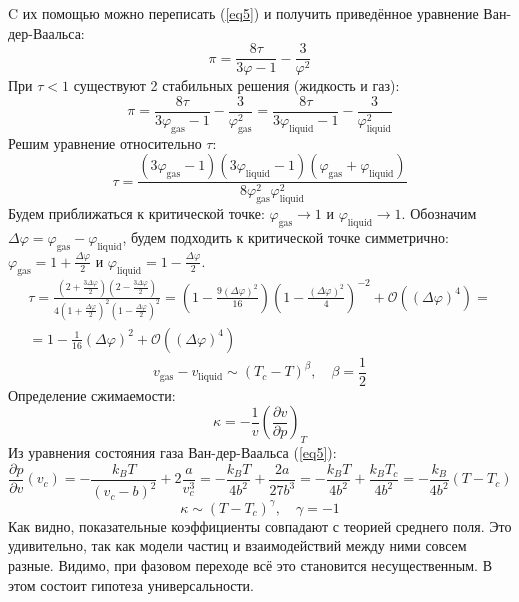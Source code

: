 \documentclass[12pt]{article}
\begin{document}
\begin{enumerate}
    C их помощью можно переписать (\ref{eq5}) и получить приведённое уравнение Ван-дер-Ваальса:
    \begin{equation}
        \pi=\frac{8\tau}{3\varphi-1}-\frac{3}{\varphi^2}
    \end{equation}
    При $\tau<1$ существуют 2 стабильных решения (жидкость и газ):
    \begin{equation}
        \pi=\frac{8\tau}{3\varphi_\text{gas}-1}-\frac{3}{\varphi^2_\text{gas}}=\frac{8\tau}{3\varphi_\text{liquid}-1}-\frac{3}{\varphi^2_\text{liquid}}
    \end{equation}
    Решим уравнение относительно $\tau$:
    \begin{equation}
        \tau=\frac{(3\varphi_\text{gas}-1)(3\varphi_\text{liquid}-1)(\varphi_\text{gas}+\varphi_\text{liquid})}{8\varphi^2_\text{gas}\varphi^2_\text{liquid}}
    \end{equation}
    Будем приближаться к критической точке: $\varphi_\text{gas}\rightarrow 1$ и $\varphi_\text{liquid}\rightarrow 1$. Обозначим $\Delta\varphi=\varphi_\text{gas}-\varphi_\text{liquid}$, будем подходить к критической точке симметрично: $\varphi_\text{gas}=1+\frac{\Delta\varphi}{2}$ и $\varphi_\text{liquid}=1-\frac{\Delta\varphi}{2}$.
    \begin{multline*}
        \tau=\frac{(2+\frac{3\Delta\varphi}{2})(2-\frac{3\Delta\varphi}{2})}{4(1+\frac{\Delta\varphi}{2})^2(1-\frac{\Delta\varphi}{2})^2}=\left(1-\frac{9(\Delta\varphi)^2}{16}\right)\left(1-\frac{(\Delta\varphi)^2}{4}\right)^{-2}+\mathcal{O}((\Delta\varphi)^4)=\\
        =1-\frac{1}{16}(\Delta\varphi)^2+\mathcal{O}((\Delta\varphi)^4)
    \end{multline*}
    \begin{equation}
        \boxed{v_\text{gas}-v_\text{liquid}\sim(T_c-T)^\beta,\quad \beta=\frac{1}{2}}
    \end{equation}
    Определение сжимаемости:
    \begin{equation}
        \kappa=-\frac{1}{v}\left(\frac{\partial v}{\partial p}\right)_T
    \end{equation}
    Из уравнения состояния газа Ван-дер-Ваальса (\ref{eq5}):
    \begin{equation}
        \frac{\partial p}{\partial v}(v_c)=-\frac{k_BT}{(v_c-b)^2}+2\frac{a}{v_c^3}=-\frac{k_BT}{4b^2}+\frac{2a}{27b^3}=-\frac{k_BT}{4b^2}+\frac{k_BT_c}{4b^2}=-\frac{k_B}{4b^2}(T-T_c)
    \end{equation}
    \begin{equation}
        \boxed{\kappa\sim(T-T_c)^{\gamma},\quad \gamma=-1}
    \end{equation}
    Как видно, показательные коэффициенты совпадают с теорией среднего поля. Это удивительно, так как модели частиц и взаимодействий между ними совсем разные. Видимо, при фазовом переходе всё это становится несущественным. В этом состоит гипотеза универсальности.
\end{enumerate}
\end{document}
